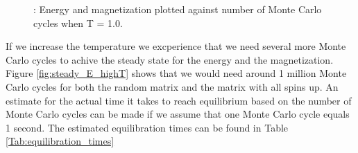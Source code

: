 \documentclass{article}
\begin{document}
{\begin{figure}[H]
\caption{: Energy and magnetization plotted against number of Monte Carlo cycles when T = 1.0.}
\label{fig:steady_E}
\end{figure}

If we increase the temperature we excperience that we need several more Monte Carlo cycles to achive the steady state for the energy and the magnetization. Figure \ref{fig:steady_E_highT} shows that we would need around 1 million Monte Carlo cycles for both the random matrix and the matrix with all spins up. An estimate for the actual time it takes to reach equilibrium based on the number of Monte Carlo cycles can be made if we assume that one Monte Carlo cycle equals 1 second. The estimated equilibration times can be found in Table \ref{Tab:equilibration_times}

}
\end{document}
